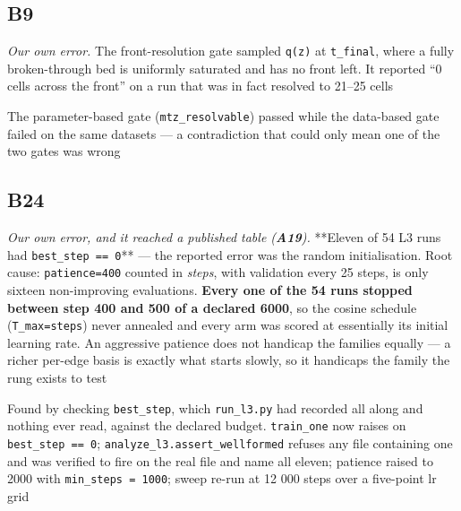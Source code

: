 \documentclass[10pt]{article}
\begin{document}
\subsection*{B9}\label{led:B9}
\begin{description}[leftmargin=0pt,itemsep=1pt]
\item[Defect.] \emph{Our own error.} The front-resolution gate sampled \texttt{q(z)} at \texttt{t\_final}, where a fully broken-through bed is uniformly saturated and has no front left. It reported ``0 cells across the front'' on a run that was in fact resolved to 21--25 cells
\item[How it was caught.] The parameter-based gate (\texttt{mtz\_resolvable}) passed while the data-based gate failed on the same datasets --- a contradiction that could only mean one of the two gates was wrong
\end{description}
\subsection*{B24}\label{led:B24}
\begin{description}[leftmargin=0pt,itemsep=1pt]
\item[Defect.] \emph{Our own error, and it reached a published table (\textbf{A19}).} **Eleven of 54 L3 runs had \texttt{best\_step == 0}** --- the reported error was the random initialisation. Root cause: \texttt{patience=400} counted in \emph{steps}, with validation every 25 steps, is only sixteen non-improving evaluations. \textbf{Every one of the 54 runs stopped between step 400 and 500 of a declared 6000}, so the cosine schedule (\texttt{T\_max=steps}) never annealed and every arm was scored at essentially its initial learning rate. An aggressive patience does not handicap the families equally --- a richer per-edge basis is exactly what starts slowly, so it handicaps the family the rung exists to test
\item[How it was caught.] Found by checking \texttt{best\_step}, which \texttt{run\_l3.py} had recorded all along and nothing ever read, against the declared budget. \texttt{train\_one} now raises on \texttt{best\_step == 0}; \texttt{analyze\_l3.assert\_wellformed} refuses any file containing one and was verified to fire on the real file and name all eleven; patience raised to 2000 with \texttt{min\_steps = 1000}; sweep re-run at 12 000 steps over a five-point lr grid
\end{description}
\end{document}
